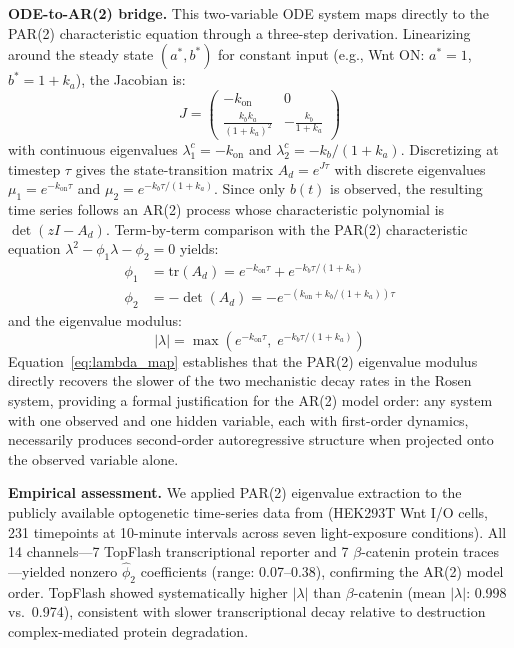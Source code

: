 \documentclass[11pt,a4paper]{article}
\begin{document}
\textbf{ODE-to-AR(2) bridge.} This two-variable ODE system maps directly to the PAR(2) characteristic equation through a three-step derivation. Linearizing around the steady state $(a^*, b^*)$ for constant input (e.g., Wnt ON: $a^* = 1$, $b^* = 1 + k_a$), the Jacobian is:
\begin{equation}
J = \begin{pmatrix} -k_{\text{on}} & 0 \\ \frac{k_b k_a}{(1+k_a)^2} & -\frac{k_b}{1+k_a} \end{pmatrix}
\label{eq:jacobian}
\end{equation}
with continuous eigenvalues $\lambda_1^c = -k_{\text{on}}$ and $\lambda_2^c = -k_b/(1+k_a)$. Discretizing at timestep $\tau$ gives the state-transition matrix $A_d = e^{J\tau}$ with discrete eigenvalues $\mu_1 = e^{-k_{\text{on}}\tau}$ and $\mu_2 = e^{-k_b\tau/(1+k_a)}$. Since only $b(t)$ is observed, the resulting time series follows an AR(2) process whose characteristic polynomial is $\det(zI - A_d)$. Term-by-term comparison with the PAR(2) characteristic equation $\lambda^2 - \phi_1\lambda - \phi_2 = 0$ yields:
\begin{align}
\phi_1 &= \text{tr}(A_d) = e^{-k_{\text{on}}\tau} + e^{-k_b\tau/(1+k_a)} \label{eq:phi1_map} \\
\phi_2 &= -\det(A_d) = -e^{-(k_{\text{on}} + k_b/(1+k_a))\tau} \label{eq:phi2_map}
\end{align}
and the eigenvalue modulus:
\begin{equation}
|\lambda| = \max\left(e^{-k_{\text{on}}\tau},\; e^{-k_b\tau/(1+k_a)}\right)
\label{eq:lambda_map}
\end{equation}
Equation~\ref{eq:lambda_map} establishes that the PAR(2) eigenvalue modulus directly recovers the slower of the two mechanistic decay rates in the Rosen system, providing a formal justification for the AR(2) model order: any system with one observed and one hidden variable, each with first-order dynamics, necessarily produces second-order autoregressive structure when projected onto the observed variable alone.

\textbf{Empirical assessment.} We applied PAR(2) eigenvalue extraction to the publicly available optogenetic time-series data from \citet{rosen2026} (HEK293T Wnt I/O cells, 231 timepoints at 10-minute intervals across seven light-exposure conditions). All 14 channels---7 TopFlash transcriptional reporter and 7 $\beta$-catenin protein traces---yielded nonzero $\hat{\phi}_2$ coefficients (range: 0.07--0.38), confirming the AR(2) model order. TopFlash showed systematically higher $|\lambda|$ than $\beta$-catenin (mean $|\lambda|$: 0.998 vs.\ 0.974), consistent with slower transcriptional decay relative to destruction complex-mediated protein degradation.
\end{document}
